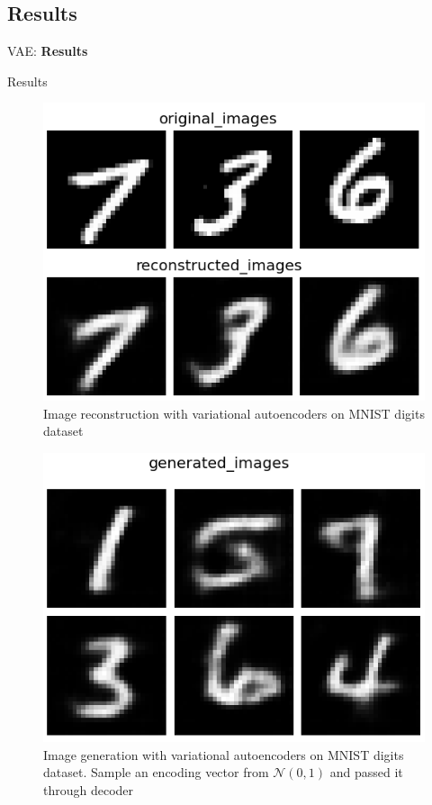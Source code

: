 \subsection{Results}
\begin{frame}{}
	\LARGE VAE: \textbf{Results}
\end{frame}

\begin{frame}[allowframebreaks]{Results}
\begin{figure}
        \centering
        \includegraphics[height=0.8\textheight, width=\textwidth, keepaspectratio]{images/vae/result-mnist-1.png}
        \caption*{Image reconstruction with variational autoencoders on MNIST digits dataset}
\end{figure}

\framebreak
\begin{figure}
        \centering
        \includegraphics[height=0.8\textheight, width=\textwidth, keepaspectratio]{images/vae/result-mnist-2.png}
        \caption*{Image generation with variational autoencoders on MNIST digits dataset. Sample an encoding vector from $\mathcal{N}(0,1)$ and passed it through decoder}
\end{figure}


\end{frame}
